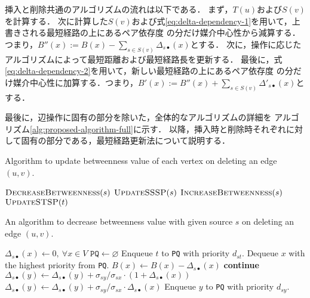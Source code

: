挿入と削除共通のアルゴリズムの流れは以下である．
まず，$T(u)$および$S(v)$を計算する．
次に計算した$S(v)$および式\eqref{eq:delta-dependency-1}を用いて，上書きされる最短経路の上にあるペア依存度
の分だけ媒介中心性から減算する．つまり，$B''(x):=B(x)-\sum_{s\in S(v)}\Delta_{s\bullet}(x)$とする．
次に，操作に応じたアルゴリズムによって最短距離および最短経路長を更新する．
最後に，式\eqref{eq:delta-dependency-2}を用いて，新しい最短経路の上にあるペア依存度
の分だけ媒介中心性に加算する．つまり，$B'(x):=B''(x)+\sum_{s\in S(v)}\Delta'_{s\bullet}(x)$とする．

最後に，辺操作に固有の部分を除いた，全体的なアルゴリズムの詳細を
アルゴリズム\ref{alg:proposed-algorithm-full}に示す．
以降，挿入時と削除時それぞれに対して固有の部分である，最短経路更新法について説明する．

\begin{algorithm}[tb]
  \caption{Algorithm to update betweenness value of each vertex on deleting an edge $(u,v)$.}
  \label{alg:proposed-algorithm-full}
  \begin{algorithmic}[1]\small
    \State $\textproc{DecreaseBetweenness}(s)$
    \State $\textproc{UpdateSSSP}(s)$
    \State $\textproc{IncreaseBetweenness}(s)$
    \EndFor
    \State $\textproc{UpdateSTSP}(t)$
    \EndFor
    \EndProcedure
  \end{algorithmic}
\end{algorithm}

\begin{algorithm}[tb]
  \caption{An algorithm to decrease betweenness value with given source $s$ on deleting an edge $(u,v)$.}
  \label{alg:decrease-betweenness}
  \begin{algorithmic}[1]\small
    \State $\Delta_{s\bullet}(x)\gets0,\:\forall x\in V$
    \State $\texttt{PQ}\gets\varnothing$
    \State Enqueue $t$ to \texttt{PQ} with priority $d_{st}$.
    \EndFor
    \State Dequeue $x$ with the highest priority from \texttt{PQ}.
    \State $B(x)\gets B(x)-\Delta_{s\bullet}(x)$
    \State \textbf{continue}
    \EndIf
    \State $\Delta_{s\bullet}(y)\gets\Delta_{s\bullet}(y)+\sigma_{sy}/\sigma_{sx}\cdot(1+\Delta_{s\bullet}(x))$
    \Else
    \State $\Delta_{s\bullet}(y)\gets\Delta_{s\bullet}(y)+\sigma_{sy}/\sigma_{sx}\cdot\Delta_{s\bullet}(x)$
    \EndIf
    \State Enqueue $y$ to \texttt{PQ} with priority $d_{sy}$.
    \EndIf
    \EndFor
    \EndWhile
    \EndProcedure
  \end{algorithmic}
\end{algorithm}

